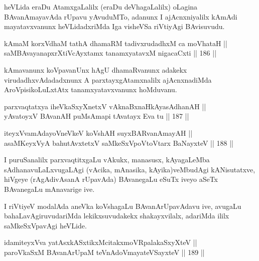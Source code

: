 \begin{artha}
heVLida eraDu AtamxgaLalilx (eraDu deVhagaLalilx) oLagina
BAvanAmayavAda rUpavu yAvuduMTo, adanunx I ajAcnxniyalilx kAmAdi
mayatavxvanunx heVLidadxriMda Iga visheVSa riVtiyAgi BAvisuvudu.
\end{artha}


\begin{shl}
kAmaM korxVdhaM tathA dhamaRM tadivxrudadhxM ca moVhataH ||  \\
saMBAvayanapxrXtiVcAyxtamx tanamxyatavxM nigacaCxti \hfill || 186 || 
\end{shl}

\begin{artha}
kAmavanunx koVpavanUnx hAgU dhamaRvanunx adakekx virudadhxvAdadadxnunx
A parxtayxgAtamxnalilx ajAcnxnadiMda AroVpisikoLuLxtAtx
tanamxyatavxvanunx hoMduvanu.
\end{artha}


\begin{shl}
parxvaqtatxya iheVkaSxyXnetxV vAknaBxnaHkAyasAdhanAH || \\
yAvatoyxV BAvanAH puMsAmapi tAvatayx Eva tu \hfill || 187 ||  
\end{shl}

\begin{shl}
iteyxVvamAdayoV\s neVkeV koVshAH suyxBARvanAmayAH || \\
asaMKeyxVyA bahutAvxtetxV saMkeSxVpoV\s toV\s tarx BaNayxteV \hfill || 188 ||  
\end{shl}

\begin{artha}
I puruSanalilx parxvaqtitxgaLu vAkukx, manasusx, kAyagaLeMba
sAdhanavuLaLxvugaLAgi (vAcika, mAnasika, kAyika)veMbudAgi
kANisutatxve, hiVgeye (rAgAdivAsanA rUpavAda) BAvanegaLu eSuTx iveyo
aSeTx BAvanegaLu mAnavarige ive.
\end{artha}

\begin{artha}
I riVtiyeV modalAda aneVka koVshagaLu BAvanArUpavAdavu ive, avugaLu
bahaLavAgiruvudariMda lekikxsuvudakekx shakayxvilalx, adariMda ililx
saMkeSxVpavAgi heVLide.
\end{artha}


\begin{shl}
idamiteyxVva yatAsxkASxtikxMcitakxmoVRpalakaSxyXteV || \\
paroVkaSxM BAvanArUpaM teVnAdoVmayateVSayxteV \hfill || 189 ||  
\end{shl}


